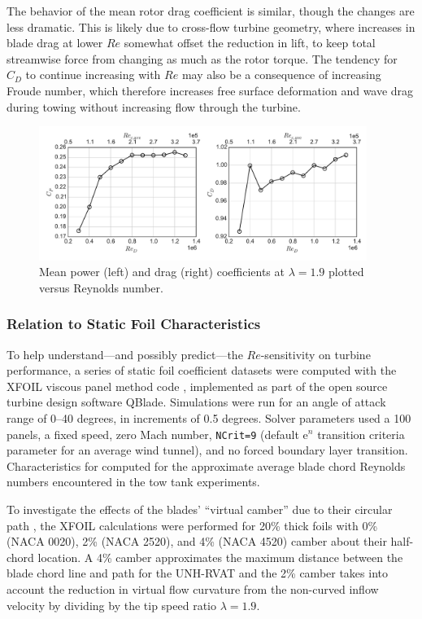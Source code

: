 \documentclass[energies,article,accept,moreauthors,pdftex,12pt,a4paper]{mdpi}
\begin{document}
The behavior of the mean rotor drag coefficient is similar, though the changes
are less dramatic. This is likely due to cross-flow turbine geometry, where
increases in blade drag at lower $Re$ somewhat offset the reduction in lift, to
keep total streamwise force from changing as much as the rotor torque. The
tendency for $C_D$ to continue increasing with $Re$ may also be a consequence of
increasing Froude number, which therefore increases free surface deformation and
wave drag during towing without increasing flow through the turbine.

\begin{figure}[ht]
\centering
\includegraphics[width=0.95\textwidth]{figures/perf_re_dep}
\caption{Mean power (left) and drag (right) coefficients at $\lambda=1.9$
plotted versus Reynolds number.} 
\label{fig:perf-Re-dep}
\end{figure}

\subsubsection{Relation to Static Foil Characteristics}

To help understand---and possibly predict---the $Re$-sensitivity on turbine
performance, a series of static foil coefficient datasets were computed with the
XFOIL viscous panel method code \cite{Drela1989}, implemented as part of the
open source turbine design software QBlade. Simulations were run for an angle of
attack range of 0--40 degrees, in increments of 0.5 degrees. Solver parameters
used a 100 panels, a fixed speed, zero Mach number, \texttt{NCrit=9} (default
$\mathrm{e}^n$ transition criteria parameter for an average wind tunnel), and no
forced boundary layer transition. Characteristics for computed for the
approximate average blade chord Reynolds numbers encountered in the tow tank
experiments.

To investigate the effects of the blades' ``virtual camber'' due to their
circular path \cite{Migliore1980}, the XFOIL calculations were performed for
20\% thick foils with 0\% (NACA 0020), 2\% (NACA 2520), and 4\% (NACA 4520)
camber about their half-chord location. A 4\% camber approximates the maximum
distance between the blade chord line and path for the UNH-RVAT and the 2\%
camber takes into account the reduction in virtual flow curvature from the
non-curved inflow velocity by dividing by the tip speed ratio $\lambda=1.9$.
\end{document}
